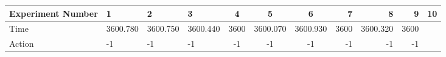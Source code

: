 \documentclass[8pt]{article}
\begin{document}
\begin{landscape}
\begin{tabular}{ | l | l | l | l | c | c | c | r | r | r | r | }
 \hline 
Experiment Number & 1 & 2 & 3 & 4 & 5 & 6 & 7 & 8 & 9 & 10\\ \hline
Time & 3600.780 & 3600.750 & 3600.440 & 3600 & 3600.070 & 3600.930 & 3600 & 3600.320 & 3600\\ \hline
Action & -1 & -1 & -1 & -1 & -1 & -1 & -1 & -1 & -1\\ \hline\end{tabular}
\end{landscape}
\end{document}
